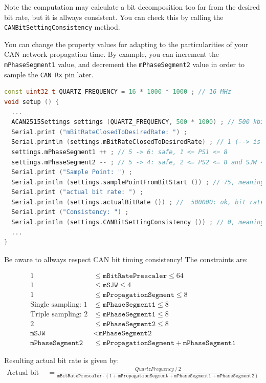 \documentclass[10pt, a4paper, obeyspaces, openany]{extarticle}
\begin{document}
Note the computation may calculate a bit decomposition too far from the desired bit rate, but it is allways consistent. You can check this by calling the \texttt{CANBitSettingConsistency} method.

You can change the property values for adapting to the particularities of your CAN network propagation time. By example, you can increment the \texttt{mPhaseSegment1} value, and decrement the \texttt{mPhaseSegment2} value in order to sample the \texttt{CAN Rx} pin later.

{ \small\begin{lstlisting}[language=c++]
const uint32_t QUARTZ_FREQUENCY = 16 * 1000 * 1000 ; // 16 MHz
void setup () {
  ...
  ACAN2515Settings settings (QUARTZ_FREQUENCY, 500 * 1000) ; // 500 kbit/s
  Serial.print ("mBitRateClosedToDesiredRate: ") ;
  Serial.println (settings.mBitRateClosedToDesiredRate) ; // 1 (--> is true)
  settings.mPhaseSegment1 ++ ; // 5 -> 6: safe, 1 <= PS1 <= 8
  settings.mPhaseSegment2 -- ; // 5 -> 4: safe, 2 <= PS2 <= 8 and SJW <= PS2
  Serial.print ("Sample Point: ") ;
  Serial.println (settings.samplePointFromBitStart ()) ; // 75, meaning 75%
  Serial.print ("actual bit rate: ") ;
  Serial.println (settings.actualBitRate ()) ; //  500000: ok, bit rate did not change
  Serial.print ("Consistency: ") ;
  Serial.println (settings.CANBitSettingConsistency ()) ; // 0, meaning Ok
  ...
}
\end{lstlisting}}

Be aware to allways respect CAN bit timing consistency! The constraints are:

\begin{align*}
1 & \leqslant \texttt{mBitRatePrescaler} \leqslant 64 \\
1 & \leqslant \texttt{mSJW} \leqslant 4 \\
1 & \leqslant \texttt{mPropagationSegment} \leqslant 8 \\
\text{Single sampling: }1 & \leqslant \texttt{mPhaseSegment1} \leqslant 8\\
\text{Triple sampling: }2 & \leqslant \texttt{mPhaseSegment1} \leqslant 8\\
2 & \leqslant \texttt{mPhaseSegment2} \leqslant 8 \\
\texttt{mSJW} &<\texttt{mPhaseSegment2}\\
\texttt{mPhaseSegment2} & \leqslant \texttt{mPropagationSegment} + \texttt{mPhaseSegment1}
\end{align*}

Resulting actual bit rate is given by:
{\small
\begin{align*}
\text{Actual bit rate} & = \frac{QuartzFrequency~/~2}{\texttt{mBitRatePrescaler} \cdot (1 + \texttt{mPropagationSegment} + \texttt{mPhaseSegment1} + \texttt{mPhaseSegment2})}
\end{align*}
}
\end{document}

